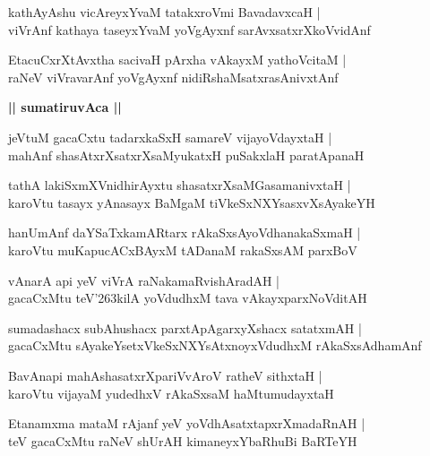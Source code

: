 \documentclass[twoside,12pt,openright]{book}
\def\S{\char'263}
\newcounter{shloka}[chapter]
\def\uvaca#1{\centerline{{\large\textbf{#1}}}}
\begin{document}
\begin{shloka}%
kathAyAshu vicAreyxYvaM tatakxroVmi BavadavxcaH |\\
viVrAnf kathaya taseyxYvaM yoVgAyxnf sarAvxsatxrXkoVvidAnf 
\end{shloka}

\begin{shloka}%
EtacuCxrXtAvxtha sacivaH pArxha vAkayxM yathoVcitaM |\\
raNeV viVravarAnf yoVgAyxnf nidiRshaMsatxrasAnivxtAnf 
\end{shloka}

\uvaca{|| sumatiruvAca ||}

\begin{shloka}%
jeVtuM gacaCxtu tadarxkaSxH samareV vijayoVdayxtaH |\\
mahAnf shasAtxrXsatxrXsaMyukatxH puSakxlaH paratApanaH 
\end{shloka}

\begin{shloka}%
tathA lakiSxmXVnidhirAyxtu shasatxrXsaMGasamanivxtaH |\\
karoVtu tasayx yAnasayx BaMgaM tiVkeSxNXYsasxvXsAyakeYH 
\end{shloka}

\begin{shloka}%
hanUmAnf daYSaTxkamARtarx rAkaSxsAyoVdhanakaSxmaH |\\
karoVtu muKapucACxBAyxM tADanaM rakaSxsAM  parxBoV 
\end{shloka}

\begin{shloka}%
vAnarA api yeV viVrA raNakamaRvishAradAH |\\
gacaCxMtu teV\S kilA yoVdudhxM tava vAkayxparxNoVditAH 
\end{shloka}

\begin{shloka}%
sumadashacx subAhushacx parxtApAgarxyXshacx satatxmAH |\\
gacaCxMtu sAyakeYsetxVkeSxNXYsAtxnoyxVdudhxM rAkaSxsAdhamAnf 
\end{shloka}

\begin{shloka}%
BavAnapi mahAshasatxrXpariVvAroV ratheV sithxtaH |\\
karoVtu vijayaM yudedhxV rAkaSxsaM haMtumudayxtaH 
\end{shloka}

\begin{shloka}%
Etanamxma mataM rAjanf yeV yoVdhAsatxtapxrXmadaRnAH |\\
teV gacaCxMtu raNeV shUrAH kimaneyxYbaRhuBi BaRTeYH 
\end{shloka}
\end{document}
